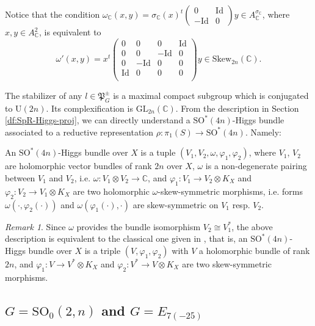 \documentclass[oneside,11pt]{amsart}
\theoremstyle{definition}
\theoremstyle{remark}
\newtheorem{rem}[thm]{Remark}
\numberwithin{thm}{section}
\numberwithin{equation}{section}
\begin{document}
Notice that the condition $\omega_{\mathbb C}(x,y)=\sigma_\mathbb C(x)^t\begin{pmatrix}
0 & \mathrm{Id} \\
-\mathrm{Id} & 0
\end{pmatrix}y \in A^{\sigma_\mathbb C}_\mathbb C$, where $x,y\in A_\mathbb C^2$, is equivalent to 
$$\omega'(x,y)=x^t\begin{pmatrix}
0 & 0 & 0 & \mathrm{Id} \\ 
0 & 0 & -\mathrm{Id} & 0 \\ 
0 & -\mathrm{Id} & 0 & 0 \\ 
\mathrm{Id} & 0 & 0 & 0 \\ \end{pmatrix}y\in\mathrm{Skew}_{2n}(\mathbb C).$$

The stabilizer of any $l\in \mathfrak{P}_G^\pm$  is a maximal compact subgroup which is conjugated to  $\mathrm{U}(2n)$. Its complexification is $\mathrm{GL}_{2n}(\mathbb C)$. From the description in Section \ref{df:SpR-Higgs-proj}, we can directly understand  a $\mathrm{SO}^*(4n)$-Higgs bundle associated to a reductive representation $\rho\colon\pi_1(S)\to\mathrm{SO}^*(4n)$. Namely: 

    An $\mathrm{SO}^*(4n)$-Higgs bundle over $X$ is a tuple $(V_1,V_2,\omega,\varphi_1,\varphi_2)$, where $V_1$, $V_2$ are holomorphic vector bundles of rank $2n$ over $X$, $\omega$ is a non-degenerate pairing between $V_1$ and $V_2$, i.e. $\omega\colon V_1\otimes V_2\to\mathbb C$, and $\varphi_1\colon V_1\to V_2\otimes K_X$ and $\varphi_2\colon V_2\to V_1\otimes K_X$ are two holomorphic $\omega$-skew-symmetric morphisms, i.e. forms $\omega(\cdot,\varphi_2(\cdot))$ and $\omega(\varphi_1(\cdot),\cdot)$ are skew-symmetric on $V_1$ resp. $V_2$.






\begin{rem}
    Since $\omega$ provides the bundle isomorphism $V_2\cong V_1^*$, the above description is equivalent to the classical one given in \cite[Section 4.2]{BGG06}, that is,  an $\mathrm{SO}^*(4n)$-Higgs bundle over $X$ is a triple $(V,\varphi_1,\varphi_2)$ with $V$ a holomorphic bundle of rank $2n$, and $\varphi_1: V\to V^*\otimes K_X$ and $\varphi_2: V^*\to V\otimes K_X$ are two skew-symmetric morphisms.
\end{rem}

\subsection{\texorpdfstring{$G=\mathrm{SO}_{0}(2,n)$}{G=SO(2,n)} and \texorpdfstring{$G=E_{7{(-25)}}$}{G=E7}}
\end{document}
